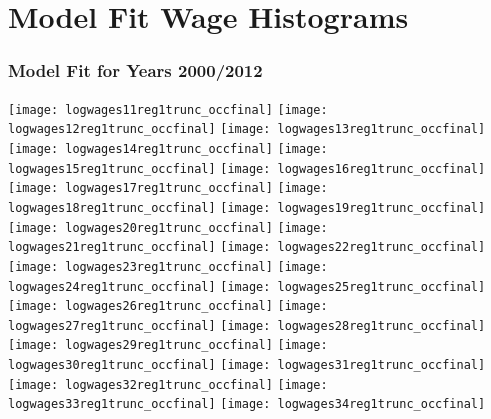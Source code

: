 \documentclass[11pt]{article}
\begin{document}
\section{Model Fit Wage Histograms}
\subsubsection{Model Fit for Years 2000/2012}

\texttt{[image: logwages11reg1trunc\_occfinal]}
\newline
\texttt{[image: logwages12reg1trunc\_occfinal]}
\clearpage
\texttt{[image: logwages13reg1trunc\_occfinal]}
\newline
\texttt{[image: logwages14reg1trunc\_occfinal]}
\clearpage
\texttt{[image: logwages15reg1trunc\_occfinal]}
\newline
\texttt{[image: logwages16reg1trunc\_occfinal]}
\clearpage
\texttt{[image: logwages17reg1trunc\_occfinal]}
\newline
\texttt{[image: logwages18reg1trunc\_occfinal]}
\clearpage
\texttt{[image: logwages19reg1trunc\_occfinal]}
\newline
\texttt{[image: logwages20reg1trunc\_occfinal]}
\clearpage
\texttt{[image: logwages21reg1trunc\_occfinal]}
\newline
\texttt{[image: logwages22reg1trunc\_occfinal]}
\clearpage
\texttt{[image: logwages23reg1trunc\_occfinal]}
\newline
\texttt{[image: logwages24reg1trunc\_occfinal]}
\clearpage
\texttt{[image: logwages25reg1trunc\_occfinal]}
\newline
\texttt{[image: logwages26reg1trunc\_occfinal]}
\clearpage
\texttt{[image: logwages27reg1trunc\_occfinal]}
\newline
\texttt{[image: logwages28reg1trunc\_occfinal]}
\clearpage
\texttt{[image: logwages29reg1trunc\_occfinal]}
\newline
\texttt{[image: logwages30reg1trunc\_occfinal]}
\clearpage
\texttt{[image: logwages31reg1trunc\_occfinal]}
\newline
\texttt{[image: logwages32reg1trunc\_occfinal]}
\clearpage
\texttt{[image: logwages33reg1trunc\_occfinal]}
\newline
\texttt{[image: logwages34reg1trunc\_occfinal]}
\end{document}
